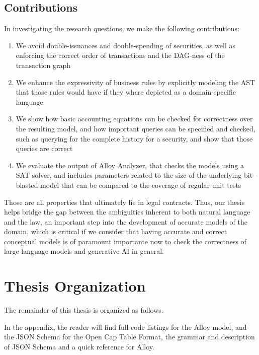 \subsection{Contributions}

In investigating the research questions, we make the following contributions:

\begin{enumerate}
	\item We avoid double-issuances and double-spending of securities, as well as enforcing the correct order of transactions and the DAG-ness of the transaction graph
	\item We enhance the expressivity of business rules by explicitly modeling the AST that those rules would have if they where depicted as a domain-specific language
	\item We show how basic accounting equations can be checked for correctness over the resulting model, and how important queries can be specified and checked, such as querying for the complete history for a security, and show that those queries are correct
	\item We evaluate the output of Alloy Analyzer, that checks the models using a SAT solver, and includes parameters related to the size of the underlying bit-blasted model that can be compared to the coverage of regular unit tests
\end{enumerate}


Those are all properties that ultimately lie in legal contracts. Thus, our thesis helps bridge the gap between the ambiguities inherent to both natural language and the law, an important step into the development of accurate models of the domain, which is critical if we consider that having accurate and correct conceptual models is of paramount importante now to check the correctness of large language models and generative AI in general.


\section{Thesis Organization}

The remainder of this thesis is organized as follows.


In the appendix, the reader will find full code listings for the Alloy model, and the JSON Schema for the Open Cap Table Format, the grammar and description of JSON Schema and a quick reference for Alloy.

